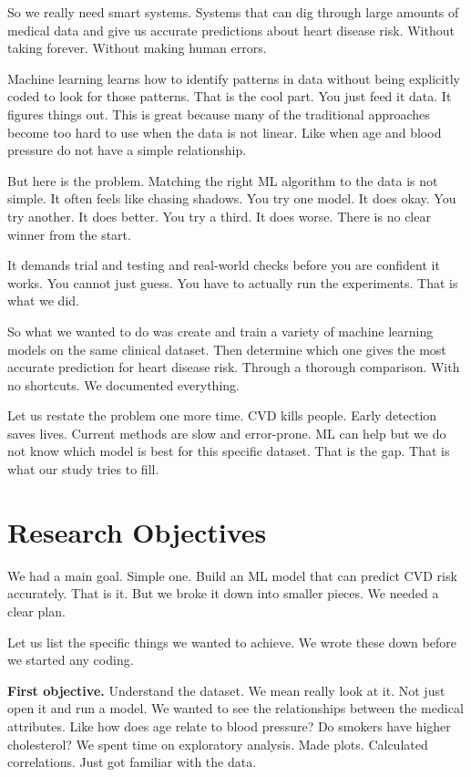 \documentclass[12pt, a4paper, oneside]{book}
\begin{document}
So we really need smart systems. Systems that can dig through large amounts of medical data and give us accurate predictions about heart disease risk. Without taking forever. Without making human errors.

Machine learning learns how to identify patterns in data without being explicitly coded to look for those patterns. That is the cool part. You just feed it data. It figures things out. This is great because many of the traditional approaches become too hard to use when the data is not linear. Like when age and blood pressure do not have a simple relationship.

But here is the problem. Matching the right ML algorithm to the data is not simple. It often feels like chasing shadows. You try one model. It does okay. You try another. It does better. You try a third. It does worse. There is no clear winner from the start.

It demands trial and testing and real-world checks before you are confident it works. You cannot just guess. You have to actually run the experiments. That is what we did.

So what we wanted to do was create and train a variety of machine learning models on the same clinical dataset. Then determine which one gives the most accurate prediction for heart disease risk. Through a thorough comparison. With no shortcuts. We documented everything.

Let us restate the problem one more time. CVD kills people. Early detection saves lives. Current methods are slow and error-prone. ML can help but we do not know which model is best for this specific dataset. That is the gap. That is what our study tries to fill.

\section{Research Objectives}
We had a main goal. Simple one. Build an ML model that can predict CVD risk accurately. That is it. But we broke it down into smaller pieces. We needed a clear plan.

Let us list the specific things we wanted to achieve. We wrote these down before we started any coding.

\textbf{First objective.} Understand the dataset. We mean really look at it. Not just open it and run a model. We wanted to see the relationships between the medical attributes. Like how does age relate to blood pressure? Do smokers have higher cholesterol? We spent time on exploratory analysis. Made plots. Calculated correlations. Just got familiar with the data.
\end{document}
